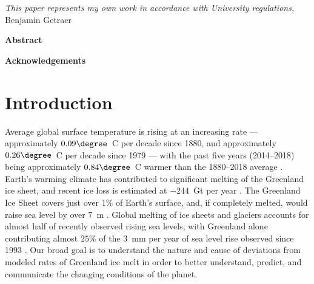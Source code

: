 \documentclass[11pt]{report}
\begin{document}



\thispagestyle{empty}
\vspace*{3in}
\begin{center}
\emph{This paper represents my own work in accordance with University regulations,} \\
Benjamin Getraer %
\end{center}
\clearpage

\begin{center}
\Large \textbf{Abstract}
\end{center}
 
 \clearpage

\begin{center}
\Large \textbf{Acknowledgements}
\end{center}

\clearpage

\thispagestyle{empty}
\tableofcontents
\clearpage

\listoffigures
\listoftables
\clearpage

\fancyhead{}
\fancyfoot{}
\pagestyle{fancyplain}

{\newpage\renewcommand{\thepage}{\arabic{page}}\setcounter{page}{1}}


\section{Introduction \label{sec:introduction}}

Average global surface temperature is rising at an increasing rate --- approximately $0.09\degree$~C per decade since 1880, and approximately $0.26\degree$~C per decade since 1979 \cite[][]{ipcc2013_atmosphere}
--- with the past five years (2014--2018) being approximately $0.84\degree$~C warmer than the 1880--2018 average \cite[][]{NOAA_stateofclimate}. Earth's warming climate has contributed to significant melting of the Greenland ice sheet, and recent ice loss is estimated at $-244$~Gt per
year \cite[][]{Harig+2015a,Harig+2016}. The Greenland Ice Sheet covers just over 1\% of
Earth's surface, and, if completely melted, would raise sea level by over $7$~m
\cite[][]{ipcc2013_cryosphere}.
Global melting of ice sheets and glaciers accounts for almost half of recently observed rising sea levels, with Greenland alone contributing almost $25$\% of the $3$~mm per year of sea level rise observed since 1993
\cite[][]{Nerem}.  Our broad goal is to understand the nature and cause of deviations from modeled rates of Greenland ice melt in order to better understand, predict, and communicate the changing conditions of the planet.
\end{document}
